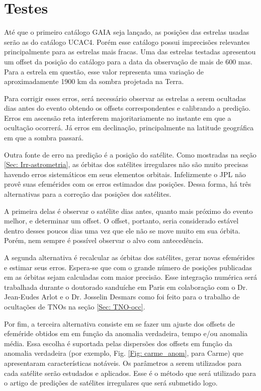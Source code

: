 \documentclass[12pt,a4paper]{monografia}
\begin{document}
\section{Testes}
\label{Sec: Irr-testes}

\indent \indent Até que o primeiro catálogo GAIA seja lançado, as posições das estrelas usadas serão as do catálogo UCAC4. Porém esse catálogo possui imprecisões relevantes principalmente para as estrelas mais fracas. Uma das estrelas testadas apresentou um offset da posição do catálogo para a data da observação de mais de 600 mas. Para a estrela em questão, esse valor representa uma variação de aproximadamente 1900 km da sombra projetada na Terra.

Para corrigir esses erros, será necessário observar as estrelas a serem ocultadas dias antes do evento obtendo os offsets correspondentes e calibrando a predição. Erros em ascensão reta interferem majoritariamente no instante em que a ocultação ocorrerá. Já erros em declinação, principalmente na latitude geográfica em que a sombra passará.

Outra fonte de erro na predição é a posição do satélite. Como mostradas na seção \ref{Sec: Irr-astrometria}, as órbitas dos satélites irregulares não são muito precisas havendo erros sistemáticos em seus elementos orbitais. Infelizmente o JPL não provê suas efemérides com os erros estimados das posições. Dessa forma, há três alternativas para a correção das posições dos satélites.

A primeira delas é observar o satélite dias antes, quanto mais próximo do evento melhor, e determinar um offset. O offset, portanto, seria considerado estável dentro desses poucos dias uma vez que ele não se move muito em sua órbita. Porém, nem sempre é possível observar o alvo com antecedência.

A segunda alternativa é recalcular as órbitas dos satélites, gerar novas efemérides e estimar seus erros. Espera-se que com o grande número de posições publicadas em \cite{GomesJunior2015-Irregular} as órbitas sejam calculadas com maior precisão. Esse integração numérica será trabalhada durante o doutorado sanduíche em Paris em colaboração com o Dr. Jean-Eudes Arlot e o Dr. Josselin Desmars como foi feito para o trabalho de ocultações de TNOs na seção \ref{Sec: TNO-occ}.

Por fim, a terceira alternativa consiste em se fazer um ajuste dos offsets de efeméride obtidos em \cite{GomesJunior2015-Irregular} em função da anomalia verdadeira, tempo e/ou anomalia média. Essa escolha é suportada pelas dispersões dos offsets em função da anomalia verdadeira (por exemplo, Fig. \ref{Fig: carme_anom}, para Carme) que apresentaram características notáveis. Os parâmetros a serem utilizados para cada satélite serão estudados e aplicados. Esse é o método que será utilizado para o artigo de predições de satélites irregulares que será submetido logo.
\end{document}
